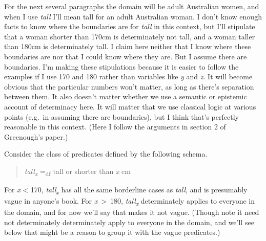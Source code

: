 \documentclass[
  10pt,
  letterpaper,
  DIV=11,
  numbers=noendperiod,
  twoside]{scrartcl}
\begin{document}
For the next several paragraphs the domain will be adult Australian
women, and when I use \emph{tall} I'll mean tall for an adult Australian
woman. I don't know enough facts to know where the boundaries are for
\emph{tall} in this context, but I'll stipulate that a woman shorter
than 170cm is determinately not tall, and a woman taller than 180cm is
determinately tall. I claim here neither that I know where these
boundaries are nor that I could know where they are. But I assume there
are boundaries. I'm making these stipulations because it is easier to
follow the examples if I use 170 and 180 rather than variables like
\emph{y} and \emph{z}. It will become obvious that the particular
numbers won't matter, as long as there's separation between them. It
also doesn't matter whether we use a semantic or epistemic account of
determinacy here. It will matter that we use classical logic at various
points (e.g.~in assuming there are boundaries), but I think that's
perfectly reasonable in this context. (Here I follow the arguments in
section 2 of Greenough's paper.)

Consider the class of predicates defined by the following schema.

\begin{quote}
\emph{tall\textsubscript{x}} =\textsubscript{df} tall or shorter than
\emph{x} cm
\end{quote}

For \emph{x} \textless{} 170, \emph{tall\textsubscript{x}} has all the
same borderline cases as \emph{tall}, and is presumably vague in
anyone's book. For \emph{x}~\textgreater~180,
\emph{tall\textsubscript{x}} determinately applies to everyone in the
domain, and for now we'll say that makes it not vague. (Though note it
need not determinately determinately apply to everyone in the domain,
and we'll see below that might be a reason to group it with the vague
predicates.)
\end{document}
